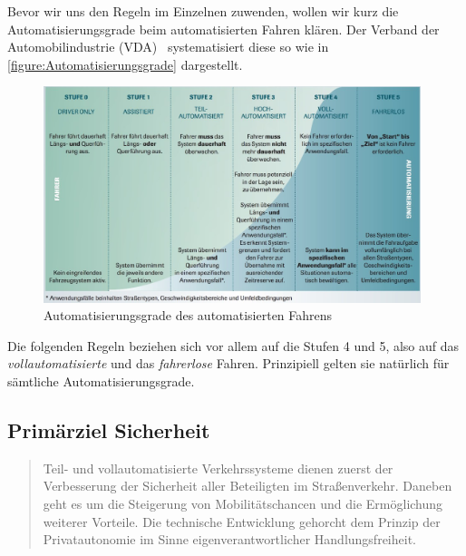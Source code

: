 \documentclass[twoside,a4paper,12pt]{article}
\begin{document}
Bevor wir uns den Regeln im Einzelnen zuwenden, wollen wir kurz die Automatisierungsgrade beim automatisierten Fahren klären. Der Verband der 
Automobilindustrie (VDA)~\cite{vda} systematisiert diese so wie in \autoref{figure:Automatisierungsgrade} dargestellt.\\

\begin{figure}[H]
\centering
\includegraphics[width=11cm]{resources/uebersicht-stufen-der-automatisierung.jpg}
\caption[Automatisierungsgrade des automatisierten Fahrens]{Automatisierungsgrade des automatisierten Fahrens~\cite{vda}}
\label{figure:Automatisierungsgrade}
\end{figure}

Die folgenden Regeln beziehen sich vor allem auf die Stufen 4 und 5, also auf das \textit{vollautomatisierte} und das \textit{fahrerlose} Fahren.
Prinzipiell gelten sie natürlich für sämtliche Automatisierungsgrade.\\

\subsection{Primärziel Sicherheit} \label{PrimaerzielSicherheit}

\begin{quote}
\glqq
Teil- und vollautomatisierte Verkehrssysteme dienen zuerst der Verbesserung der Sicherheit aller Beteiligten im Straßenverkehr. 
Daneben geht es um die Steigerung von Mobilitätschancen und die Ermöglichung weiterer Vorteile. Die technische Entwicklung 
gehorcht dem Prinzip der Privatautonomie im Sinne eigenverantwortlicher Handlungsfreiheit.\grqq\mbox{~\cite[S. 10]{ek}}
\end{quote}
\end{document}
